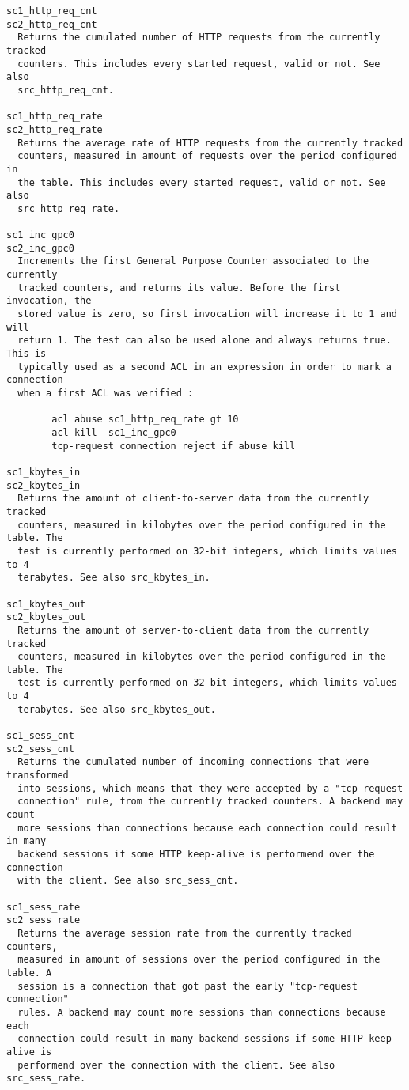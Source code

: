 \begin{verbatim}
sc1_http_req_cnt
sc2_http_req_cnt
  Returns the cumulated number of HTTP requests from the currently tracked
  counters. This includes every started request, valid or not. See also
  src_http_req_cnt.

sc1_http_req_rate
sc2_http_req_rate
  Returns the average rate of HTTP requests from the currently tracked
  counters, measured in amount of requests over the period configured in
  the table. This includes every started request, valid or not. See also
  src_http_req_rate.

sc1_inc_gpc0
sc2_inc_gpc0
  Increments the first General Purpose Counter associated to the currently
  tracked counters, and returns its value. Before the first invocation, the
  stored value is zero, so first invocation will increase it to 1 and will
  return 1. The test can also be used alone and always returns true. This is
  typically used as a second ACL in an expression in order to mark a connection
  when a first ACL was verified :

        acl abuse sc1_http_req_rate gt 10
        acl kill  sc1_inc_gpc0
        tcp-request connection reject if abuse kill

sc1_kbytes_in
sc2_kbytes_in
  Returns the amount of client-to-server data from the currently tracked
  counters, measured in kilobytes over the period configured in the table. The
  test is currently performed on 32-bit integers, which limits values to 4
  terabytes. See also src_kbytes_in.

sc1_kbytes_out
sc2_kbytes_out
  Returns the amount of server-to-client data from the currently tracked
  counters, measured in kilobytes over the period configured in the table. The
  test is currently performed on 32-bit integers, which limits values to 4
  terabytes. See also src_kbytes_out.

sc1_sess_cnt
sc2_sess_cnt
  Returns the cumulated number of incoming connections that were transformed
  into sessions, which means that they were accepted by a "tcp-request
  connection" rule, from the currently tracked counters. A backend may count
  more sessions than connections because each connection could result in many
  backend sessions if some HTTP keep-alive is performend over the connection
  with the client. See also src_sess_cnt.

sc1_sess_rate
sc2_sess_rate
  Returns the average session rate from the currently tracked counters,
  measured in amount of sessions over the period configured in the table. A
  session is a connection that got past the early "tcp-request connection"
  rules. A backend may count more sessions than connections because each
  connection could result in many backend sessions if some HTTP keep-alive is
  performend over the connection with the client. See also src_sess_rate.


\end{verbatim}
